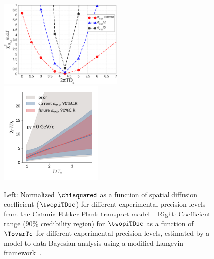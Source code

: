 \begin{figure}[ht]
	\begin{center}
		\includegraphics[width=0.54\textwidth]{hf/figures/chi_Raa_Ds.pdf}
		\includegraphics[width=0.45\textwidth]{hf/figures/Plot_posterior_D2piT_calibrate_on_Duke-central_p0.pdf}
		\caption{Left: Normalized $\chisquared$ as a function of spatial diffusion coefficient ($\twopiTDsc$) for different experimental precision levels from the Catania Fokker-Plank transport model~\cite{Das:2015ana,Das:2013kea}. Right: Coefficient range (90\% credibility region) for $\twopiTDsc$ as a function of $\ToverTc$ for different experimental precision levels, estimated by a model-to-data Bayesian analysis using a modified Langevin framework~\cite{PhysRevC.97.014907}.}
		\label{fig:RAAv2.Dstheory}
	\end{center}
\end{figure}

